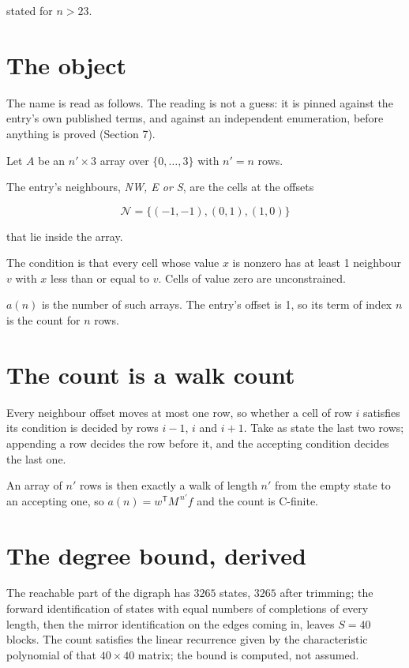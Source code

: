 \documentclass[11pt]{article}
\theoremstyle{definition}
\begin{document}
stated for $n > 23$.

\section{The object}

The name is read as follows. The reading is not a guess: it is pinned against the entry's own published terms, and against an independent enumeration, before anything is proved (Section 7).

Let $A$ be an $n' \times 3$ array over $\{0,\dots,3\}$ with $n' = n$ rows.

The entry's neighbours, {\itshape NW, E or S}, are the cells at the offsets

\[\mathcal{N} = \{(-1,-1), (0,1), (1,0)\}\]

that lie inside the array.

The condition is that every cell whose value $x$ is nonzero has at least 1 neighbour $v$ with $x$ less than or equal to $v$. Cells of value zero are unconstrained.

$a(n)$ is the number of such arrays. The entry's offset is 1, so its term of index $n$ is the count for $n$ rows.

\section{The count is a walk count}

Every neighbour offset moves at most one row, so whether a cell of row $i$ satisfies its condition is decided by rows $i-1$, $i$ and $i+1$. Take as state the last two rows; appending a row decides the row before it, and the accepting condition decides the last one.

An array of $n'$ rows is then exactly a walk of length $n'$ from the empty state to an accepting one, so $a(n) = w^{\mathsf T}M^{\,n'}f$ and the count is C-finite.

\section{The degree bound, derived}

The reachable part of the digraph has $3265$ states, $3265$ after trimming; the forward identification of states with equal numbers of completions of every length, then the mirror identification on the edges coming in, leaves $S = 40$ blocks. The count satisfies the linear recurrence given by the characteristic polynomial of that $40\times40$ matrix; the bound is computed, not assumed.
\end{document}
